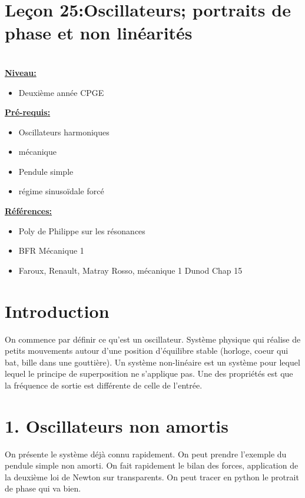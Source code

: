 \documentclass[french, a4paper, 10pt, twocolumn, landscape]{article}
\begin{document}
\section*{Leçon 25:Oscillateurs; portraits de phase et non linéarités}

\hrulefill\\

\noindent\underline{\textbf{Niveau:}} 
\begin{itemize}
    \item Deuxième année CPGE
\end{itemize}

\noindent\underline{\textbf{Pré-requis:}}
\begin{itemize}
    \item Oscillateurs harmoniques
    \item mécanique
    \item Pendule simple
    \item régime sinusoïdale forcé
\end{itemize}

\noindent\underline{\textbf{Références:}}

\begin{itemize}
    \item Poly de Philippe sur les résonances
    \item BFR Mécanique 1 
    \item Faroux, Renault, Matray Rosso, mécanique 1 Dunod Chap 15
\end{itemize}

\hrulefill


\section*{Introduction}

On commence par définir ce qu'est un oscillateur. Système physique qui réalise de petits mouvements autour d'une position d'équilibre stable (horloge, coeur qui bat, bille dans une gouttière). Un système non-linéaire est un système pour lequel lequel le principe de superposition ne s'applique pas. Une des propriétés est que la fréquence de sortie est différente de celle de l'entrée.

\section*{1. Oscillateurs non amortis}

On présente le système déjà connu rapidement. On peut prendre l'exemple du pendule simple non amorti. On fait rapidement le bilan des forces, application de la deuxième loi de Newton sur transparents. On peut tracer en python le protrait de phase qui va bien. 
\end{document}
